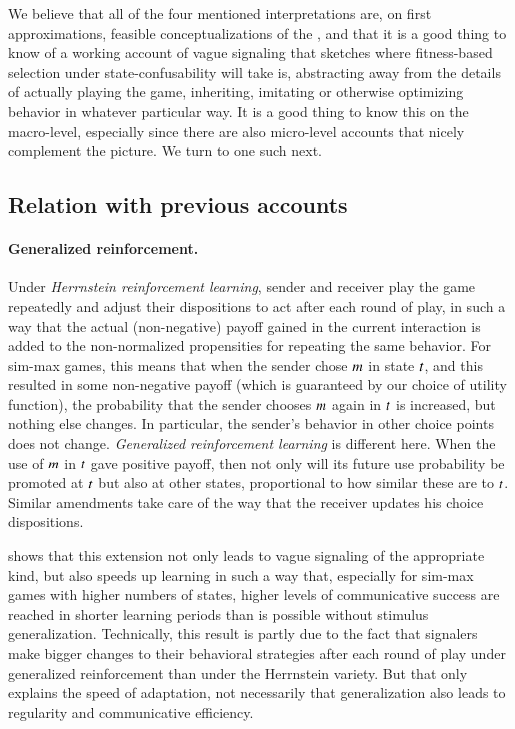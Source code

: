 We believe that all of the four mentioned interpretations are, on
first approximations, feasible conceptualizations of the \rdd, and
that it is a good thing to know of a working account of vague
signaling that sketches where fitness-based selection under
state-confusability will take is, abstracting away from the details of
actually playing the game, inheriting, imitating or otherwise
optimizing behavior in whatever particular way. It is a good thing to
know this on the macro-level, especially since there are also
micro-level accounts that nicely complement the picture. We turn to
one such next.


\subsection{Relation with previous accounts}
\label{sec:relat-with-prev}

\paragraph{Generalized reinforcement.}

Under \emph{Herrnstein reinforcement learning}, sender and
receiver play the game repeatedly and adjust their dispositions to act
after each round of play, in such a way that the actual (non-negative)
payoff gained in the current interaction is added to the
non-normalized propensities for repeating the same behavior. For
sim-max games, this means that when the sender chose $m$ in state
$t$, and this resulted in some non-negative payoff (which is
guaranteed by our choice of utility function), the probability that
the sender chooses $m$ again in $t$ is increased, but
nothing else changes. In particular, the sender's behavior in other
choice points does not change. \emph{Generalized reinforcement
  learning} is different here. When the use of $m$ in $t$
gave positive payoff, then not only will its future use probability be
promoted at $t$ but also at other states, proportional to how
similar these are to $t$. Similar amendments take care of the way
that the receiver updates his choice dispositions.

\citet{OConnor2013:The-Evolution-o} shows that this extension not only
leads to vague signaling of the appropriate kind, but also speeds up
learning in such a way that, especially for sim-max games with higher
numbers of states, higher levels of communicative success are reached
in shorter learning periods than is possible without stimulus
generalization. Technically, this result is partly due to the fact
that signalers make bigger changes to their behavioral strategies
after each round of play under generalized reinforcement than under
the Herrnstein variety. But that only explains the speed of
adaptation, not necessarily that generalization also leads to
regularity and communicative efficiency.

